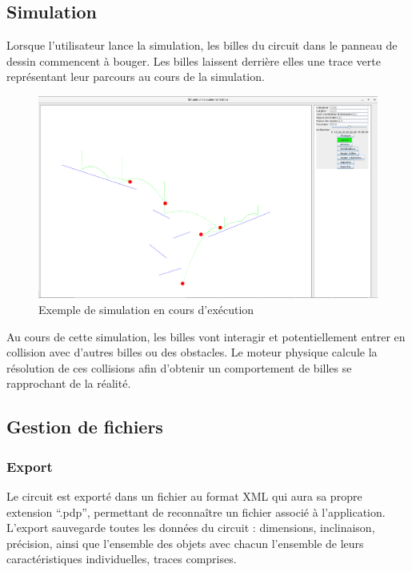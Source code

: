 \documentclass{report}
\begin{document}
\subsection{Simulation}

Lorsque l’utilisateur lance la simulation, les billes du circuit dans le panneau de dessin commencent à bouger. Les billes laissent derrière elles une trace verte représentant leur parcours au cours de la simulation.

\begin{figure}[H]
\centering
\includegraphics[scale=0.25]{simulation.png}
\caption{Exemple de simulation en cours d'exécution}
\end{figure}

Au cours de cette simulation, les billes vont interagir et potentiellement entrer en collision avec d’autres billes ou des obstacles. Le moteur physique calcule la résolution de ces collisions afin d’obtenir un comportement de billes se rapprochant de la réalité.

\newpage
\subsection{Gestion de fichiers}

\subsubsection{Export}

Le circuit est exporté dans un fichier au format XML qui aura sa propre extension “.pdp”, permettant de reconnaître un fichier associé à l’application. L’export sauvegarde toutes les données du circuit : dimensions, inclinaison, précision, ainsi que l’ensemble des objets avec chacun l’ensemble de leurs caractéristiques individuelles, traces comprises.
\end{document}

